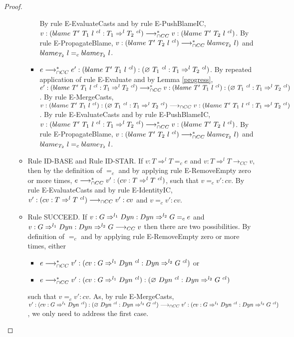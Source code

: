 \documentclass[a4paper]{article}
\begin{document}
\begin{proof}
\begin{itemize}
\begin{itemize}
\begin{itemize}
            By rule E-EvaluateCasts and by rule E-PushBlameIC, $v : (blame\ T'\ T_1\ l\ ^{cl} : T_1 \Rightarrow^l T_2\ ^{cl}) \longrightarrow_{\cap CC}^* v : (blame\ T'\ T_2\ l\ ^{cl})$.
            By rule E-PropagateBlame, $v : (blame\ T'\ T_2\ l\ ^{cl}) \longrightarrow_{\cap CC}^* blame_{T_2}\ l)$ and $blame_{T_2}\ l =_c blame_{T_2}\ l$.
            \item $e \longrightarrow_{\cap CC}^* e' : (blame\ T'\ T_1\ l\ ^{cl}) : (\varnothing\ T_1\ ^{cl} : T_1 \Rightarrow^l T_2\ ^{cl})$.
            By repeated application of rule E-Evaluate and by Lemma \ref{progress}, $e' : (blame\ T'\ T_1\ l\ ^{cl} : T_1 \Rightarrow^l T_2\ ^{cl}) \longrightarrow_{\cap CC}^* v : (blame\ T'\ T_1\ l\ ^{cl}) : (\varnothing\ T_1\ ^{cl} : T_1 \Rightarrow^l T_2\ ^{cl})$.
            By rule E-MergeCasts, $v : (blame\ T'\ T_1\ l\ ^{cl}) : (\varnothing\ T_1\ ^{cl} : T_1 \Rightarrow^l T_2\ ^{cl}) \longrightarrow_{\cap CC} v : (blame\ T'\ T_1\ l\ ^{cl} : T_1 \Rightarrow^l T_2\ ^{cl})$.
            By rule E-EvaluateCasts and by rule E-PushBlameIC, $v : (blame\ T'\ T_1\ l\ ^{cl} : T_1 \Rightarrow^l T_2\ ^{cl}) \longrightarrow_{\cap CC}^* v : (blame\ T'\ T_2\ l\ ^{cl})$.
            By rule E-PropagateBlame, $v : (blame\ T'\ T_2\ l\ ^{cl}) \longrightarrow_{\cap CC}^* blame_{T_2}\ l)$ and $blame_{T_2}\ l =_c blame_{T_2}\ l$.
        \end{itemize}
        \item Rule ID-BASE and Rule ID-STAR.
        If $v : T \Rightarrow^l T =_c e$ and $v : T \Rightarrow^l T \longrightarrow_{CC} v$, then by the definition of $=_c$ and by applying rule E-RemoveEmpty zero or more times, $e \gios^* v' : (cv : T \Rightarrow^l T\ ^{cl})$, such that $v =_c v' : cv$.
        By rule E-EvaluateCasts and by rule E-IdentityIC, $v' : (cv : T \Rightarrow^l T\ ^{cl}) \longrightarrow_{\cap CC} v' : cv$ and $v =_c v' : cv$.
        \item Rule SUCCEED.
        If $v : G \Rightarrow^{l_1} Dyn : Dyn \Rightarrow^{l_2} G =_c e$ and $v : G \Rightarrow^{l_1} Dyn : Dyn \Rightarrow^{l_2} G \longrightarrow_{CC} v$ then there are two possibilities.
        By definition of $=_c$ and by applying rule E-RemoveEmpty zero or more times, either
        \begin{itemize}
            \item $e \longrightarrow_{\cap CC}^* v' : (cv : G \Rightarrow^{l_1} Dyn\ ^{cl} : Dyn \Rightarrow^{l_2} G\ ^{cl})$ or
            \item $e \longrightarrow_{\cap CC}^* v' : (cv : G \Rightarrow^{l_1} Dyn\ ^{cl}) : (\varnothing\ Dyn\ ^{cl} : Dyn \Rightarrow^{l_2} G\ ^{cl})$
        \end{itemize}
        such that $v =_c v' : cv$.
        As, by rule E-MergeCasts, $v' : (cv : G \Rightarrow^{l_1} \Dyn\ ^{cl}) : (\emptycast{\Dyn}{cl} : \Dyn \Rightarrow^{l_2} G\ ^{cl}) \gios v' : (cv : G \Rightarrow^{l_1} \Dyn\ ^{cl} : \Dyn \Rightarrow^{l_2} G\ ^{cl})$, we only need to address the first case.

\end{itemize}
\end{itemize}
\end{proof}
\end{document}
